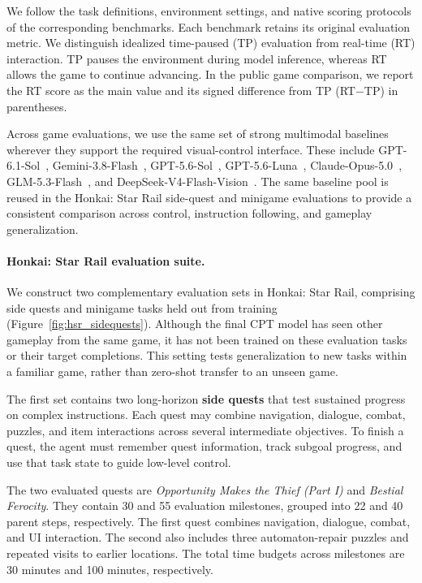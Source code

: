 We follow the task definitions, environment settings, and native scoring protocols of the corresponding benchmarks.
Each benchmark retains its original evaluation metric.
We distinguish idealized time-paused (TP) evaluation from real-time (RT) interaction. TP pauses the environment during model inference, whereas RT allows the game to continue advancing. In the public game comparison, we report the RT score as the main value and its signed difference from TP (RT$-$TP) in parentheses.

Across game evaluations, we use the same set of strong multimodal baselines wherever they support the required visual-control interface.
These include GPT-6.1-Sol~\cite{openai2026gpt61sol}, Gemini-3.8-Flash~\cite{google2026gemini38flash}, GPT-5.6-Sol~\cite{gpt56card}, GPT-5.6-Luna~\cite{gpt56card}, Claude-Opus-5.0~\cite{anthropic2026opus5}, GLM-5.3-Flash~\cite{glm53flash}, and DeepSeek-V4-Flash-Vision~\cite{deepseekv4flashvision}.
The same baseline pool is reused in the Honkai: Star Rail side-quest and minigame evaluations to provide a consistent comparison across control, instruction following, and gameplay generalization. 

\paragraph{Honkai: Star Rail evaluation suite.}
We construct two complementary evaluation sets in Honkai: Star Rail, comprising side quests and minigame tasks held out from training (Figure~\ref{fig:hsr_sidequests}). Although the final CPT model has seen other gameplay from the same game, it has not been trained on these evaluation tasks or their target completions. This setting tests generalization to new tasks within a familiar game, rather than zero-shot transfer to an unseen game.

The first set contains two long-horizon \textbf{side quests} that test sustained progress on complex instructions. Each quest may combine navigation, dialogue, combat, puzzles, and item interactions across several intermediate objectives.
To finish a quest, the agent must remember quest information, track subgoal progress, and use that task state to guide low-level control.

The two evaluated quests are \emph{Opportunity Makes the Thief (Part I)} and \emph{Bestial Ferocity}. They contain 30 and 55 evaluation milestones, grouped into 22 and 40 parent steps, respectively. The first quest combines navigation, dialogue, combat, and UI interaction. The second also includes three automaton-repair puzzles and repeated visits to earlier locations. The total time budgets across milestones are 30 minutes and 100 minutes, respectively.

